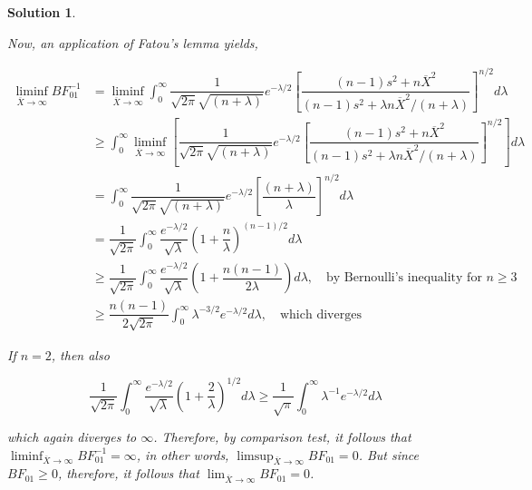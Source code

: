 \documentclass[12pt]{article}
\theoremstyle{problemstyle}
\newtheorem*{solution*}{Solution}
\begin{document}
\begin{solution*}
\begin{enumerate}
        Now, an application of Fatou's lemma yields,

        \begin{align*}
            \liminf_{\overline{X} \rightarrow \infty} BF_{01}^{-1}
            & = \liminf_{\overline{X} \rightarrow \infty} \int_0^\infty \dfrac{1}{\sqrt{2\pi}\sqrt{(n+\lambda)}} e^{-\lambda/2} \left[ \dfrac{(n-1)s^2 + n\overline{X}^2 }{ (n-1)s^2 + \lambda n\overline{X}^2/(n+\lambda) } \right]^{n/2} d\lambda \\
            & \geq \int_0^\infty \liminf_{\overline{X} \rightarrow \infty} \left[\dfrac{1}{\sqrt{2\pi}\sqrt{(n+\lambda)}} e^{-\lambda/2} \left[ \dfrac{(n-1)s^2 + n\overline{X}^2 }{ (n-1)s^2 + \lambda n\overline{X}^2/(n+\lambda) } \right]^{n/2}\right] d\lambda\\
            & = \int_0^\infty \dfrac{1}{\sqrt{2\pi}\sqrt{(n+\lambda)}} e^{-\lambda/2} \left[ \dfrac{(n+\lambda)}{\lambda} \right]^{n/2} d\lambda\\
            & = \dfrac{1}{\sqrt{2\pi}} \int_0^\infty \dfrac{e^{-\lambda/2}}{\sqrt{\lambda}} \left( 1 + \dfrac{n}{\lambda} \right)^{(n-1)/2} d\lambda\\
            & \geq \dfrac{1}{\sqrt{2\pi}} \int_0^\infty \dfrac{e^{-\lambda/2}}{\sqrt{\lambda}} \left( 1 + \dfrac{n(n-1)}{2\lambda} \right) d\lambda, \quad \text{by Bernoulli's inequality for } n\geq 3\\
            & \geq \dfrac{n(n-1)}{2\sqrt{2\pi}} \int_0^\infty \lambda^{-3/2} e^{-\lambda/2} d\lambda, \quad \text{which diverges}
        \end{align*}

        If $n = 2$, then also 
        
        $$
        \dfrac{1}{\sqrt{2\pi}} \int_0^\infty \dfrac{e^{-\lambda/2}}{\sqrt{\lambda}} \left( 1 + \dfrac{2}{\lambda}\right)^{1/2}d\lambda \geq \dfrac{1}{\sqrt{\pi}} \int_0^\infty \lambda^{-1} e^{-\lambda/2}d\lambda
        $$

        which again diverges to $\infty$. Therefore, by comparison test, it follows that $\liminf_{\overline{X} \rightarrow \infty} BF_{01}^{-1} = \infty$, in other words, $\limsup_{\overline{X} \rightarrow \infty} BF_{01} = 0$. But since $BF_{01} \geq 0$, therefore, it follows that $\lim_{\overline{X} \rightarrow \infty} BF_{01} = 0$.

    \end{enumerate}


\end{solution*}
\pagebreak
\end{document}
